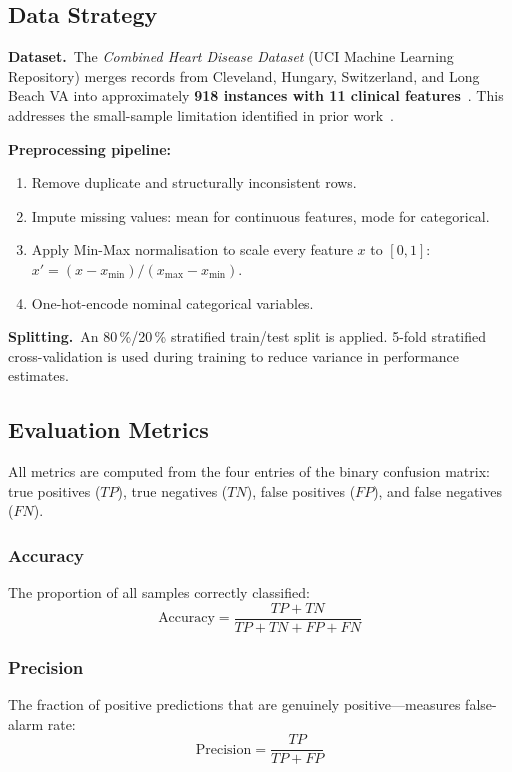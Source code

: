 \documentclass[12pt, a4paper]{article}
\begin{document}
\subsection{Data Strategy}

\textbf{Dataset.}~The \textit{Combined Heart Disease Dataset} (UCI Machine
Learning Repository) merges records from Cleveland, Hungary, Switzerland, and
Long Beach VA into approximately \textbf{918 instances with 11 clinical
features}~\cite{uci_heart,detrano1989}. This addresses the small-sample
limitation identified in prior work~\cite{singh2024}.

\medskip
\textbf{Preprocessing pipeline:}
\begin{enumerate}
  \item Remove duplicate and structurally inconsistent rows.
  \item Impute missing values: mean for continuous features, mode for categorical.
  \item Apply Min-Max normalisation to scale every feature $x$ to $[0,1]$:
        $x' = (x - x_{\min})/(x_{\max} - x_{\min})$.
  \item One-hot-encode nominal categorical variables.
\end{enumerate}

\textbf{Splitting.}~An 80\,\%/20\,\% stratified train/test split is applied.
5-fold stratified cross-validation is used during training to reduce variance
in performance estimates.

\subsection{Evaluation Metrics}

All metrics are computed from the four entries of the binary confusion matrix:
true positives ($TP$), true negatives ($TN$), false positives ($FP$), and false
negatives ($FN$).

\subsubsection*{Accuracy}
The proportion of all samples correctly classified:
\begin{equation}
  \text{Accuracy} = \frac{TP + TN}{TP + TN + FP + FN}
  \label{eq:accuracy}
\end{equation}

\subsubsection*{Precision}
The fraction of positive predictions that are genuinely positive---measures
false-alarm rate:
\begin{equation}
  \text{Precision} = \frac{TP}{TP + FP}
  \label{eq:precision}
\end{equation}
\end{document}
